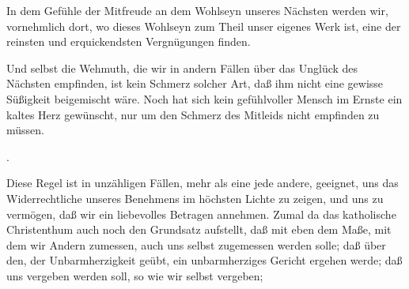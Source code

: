 \begin{aufza}
\begin{aufzb}
\begin{aufzc}
\item In dem Gefühle der Mitfreude an dem Wohlseyn unseres Nächsten werden wir, vornehmlich dort, wo dieses Wohlseyn zum Theil unser eigenes Werk ist, eine der reinsten und erquickendsten Vergnügungen finden.
\item Und selbst die Wehmuth, die wir in andern Fällen über das Unglück des Nächsten empfinden, ist kein Schmerz solcher Art, daß ihm nicht eine gewisse Süßigkeit beigemischt wäre. Noch hat sich kein gefühlvoller Mensch im Ernste ein kaltes Herz gewünscht, nur um den Schmerz des Mitleids nicht empfinden zu müssen.
\end{aufzc}
\end{aufzb}
\item {}.~\par
Diese Regel ist in unzähligen Fällen, mehr als eine jede andere, geeignet, uns das Widerrechtliche unseres Benehmens im höchsten Lichte zu zeigen, und uns zu vermögen, daß wir ein liebevolles Betragen annehmen. Zumal da das katholische Christenthum auch noch den Grundsatz aufstellt, daß mit eben dem Maße, mit dem wir Andern zumessen, auch uns selbst zugemessen werden solle; daß über den, der Unbarmherzigkeit geübt, ein unbarmherziges Gericht ergehen werde; daß uns vergeben werden soll, so wie wir selbst vergeben; \usw\
\end{aufza}

